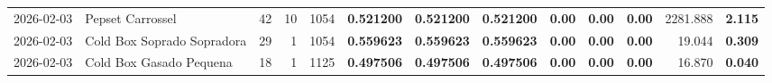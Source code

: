 {\begin{center}
{\begin{tabular}{@{}llrrrrrrrrrrr@{}}
2026-02-03 & Pepset Carrossel & 42 & 10 & 1054 & \textbf{0.521200} & \textbf{0.521200} & \textbf{0.521200} & \textbf{0.00} & \textbf{0.00} & \textbf{0.00} & 2281.888 & \textbf{2.115} \\
2026-02-03 & Cold Box Soprado Sopradora & 29 & 1 & 1054 & \textbf{0.559623} & \textbf{0.559623} & \textbf{0.559623} & \textbf{0.00} & \textbf{0.00} & \textbf{0.00} & 19.044 & \textbf{0.309} \\
2026-02-03 & Cold Box Gasado Pequena & 18 & 1 & 1125 & \textbf{0.497506} & \textbf{0.497506} & \textbf{0.497506} & \textbf{0.00} & \textbf{0.00} & \textbf{0.00} & 16.870 & \textbf{0.040} \\
\bottomrule
\end{tabular}%
}
\end{center}
}
\vspace*{\fill}
\newpage
\vspace*{\fill}
